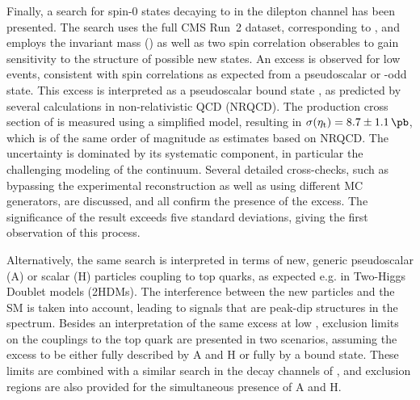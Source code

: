 
\smallskip

Finally, a search for spin-0 states decaying to \ttbar in the dilepton channel has been presented. The search uses the full CMS Run~2 dataset, corresponding to \sqrtsRII, and employs the invariant \ttbar mass (\mtt) as well as two \ttbar spin correlation obserables to gain sensitivity to the \CP structure of possible new states. An excess is observed for low \mtt events, consistent with spin correlations as expected from a pseudoscalar or \CP-odd state. This excess is interpreted as a pseudoscalar \ttbar bound state \etat, as predicted by several calculations in non-relativistic QCD (NRQCD). The production cross section of \etat is measured using a simplified \etat model, resulting in $\sigetat = 8.7 \pm 1.1  \, \si{\pb}$, which is of the same order of magnitude as estimates based on NRQCD. The uncertainty is dominated by its systematic component, in particular the challenging modeling of the \ttbar continuum. Several detailed cross-checks, such as bypassing the experimental \ttbar reconstruction as well as using different MC generators, are discussed, and all confirm the presence of the excess. The significance of the result exceeds five standard deviations, giving the first observation of this process.

Alternatively, the same search is interpreted in terms of new, generic pseudoscalar (A) or scalar (H) particles coupling to top quarks, as expected e.g. in Two-Higgs Doublet models (2HDMs). The interference between the new particles and the SM is taken into account, leading to signals that are peak-dip structures in the \mtt spectrum. Besides an interpretation of the same excess at low \mtt, exclusion limits on the couplings to the top quark are presented in two scenarios, assuming the excess to be either fully described by A and H or fully by a \ttbar bound state. These limits are combined with a similar search in the \ljets decay channels of \ttbar, and exclusion regions are also provided for the simultaneous presence of A and H.

